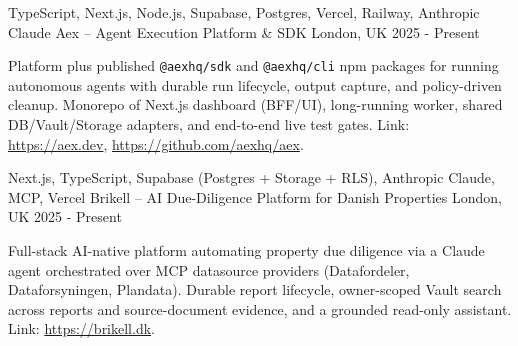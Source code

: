 

\begin{cventries}

  \cventry
    {TypeScript, Next.js, Node.js, Supabase, Postgres, Vercel, Railway, Anthropic Claude} %
    {Aex -- Agent Execution Platform \& SDK} %
    {London, UK} %
    {2025 - Present} %
    {
      \begin{cvitems} %
        \item {Platform plus published \texttt{@aexhq/sdk} and \texttt{@aexhq/cli} npm packages for running autonomous agents with durable run lifecycle, output capture, and policy-driven cleanup. Monorepo of Next.js dashboard (BFF/UI), long-running worker, shared DB/Vault/Storage adapters, and end-to-end live test gates. Link: \href{https://aex.dev}{https://aex.dev}, \href{https://github.com/aexhq/aex}{https://github.com/aexhq/aex}.}
      \end{cvitems}
    }

  \cventry
    {Next.js, TypeScript, Supabase (Postgres + Storage + RLS), Anthropic Claude, MCP, Vercel} %
    {Brikell -- AI Due-Diligence Platform for Danish Properties} %
    {London, UK} %
    {2025 - Present} %
    {
      \begin{cvitems} %
        \item {Full-stack AI-native platform automating property due diligence via a Claude agent orchestrated over MCP datasource providers (Datafordeler, Dataforsyningen, Plandata). Durable report lifecycle, owner-scoped Vault search across reports and source-document evidence, and a grounded read-only assistant. Link: \href{https://brikell.dk}{https://brikell.dk}.}
      \end{cvitems}
    }


\end{cventries}
